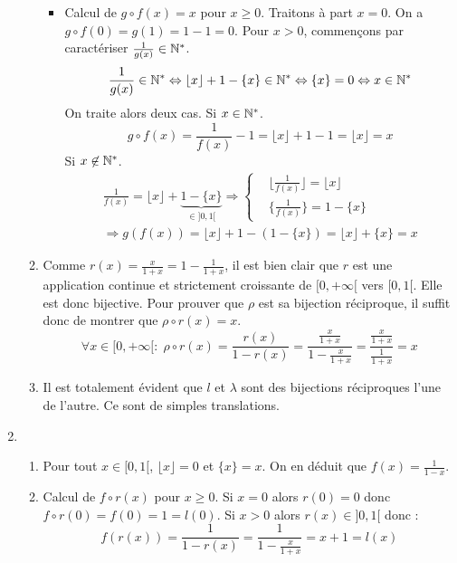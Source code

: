 \begin{enumerate}
\begin{enumerate}
\begin{itemize}
 \item Calcul de $g \circ f(x)=x$ pour $x\geq 0$.\newline
Traitons à part $x=0$. On a $g\circ f(0)=g(1)=1-1=0$.\newline
Pour $x>0$, commençons par caractériser $\frac{1}{g(x)}\in \mathbb{N}^*$.
\begin{displaymath}
 \frac{1}{g(x)}\in \mathbb{N}^* \Leftrightarrow \lfloor x\rfloor +1-\{x\}\in \mathbb{N}^*
\Leftrightarrow \{x\}=0 \Leftrightarrow x\in \mathbb{N}^*
\end{displaymath}
On traite alors deux cas.\newline
Si $x\in \mathbb{N}^*$.
\begin{displaymath}
 g\circ f(x) = \frac{1}{f(x)}-1=\lfloor x\rfloor +1-1=\lfloor x\rfloor=x
\end{displaymath}
Si $x\not\in \mathbb{N}^*$.
\begin{multline*}
 \frac{1}{f(x)}=\lfloor x\rfloor + \underset{\in ]0,1[}{\underbrace{1-\{x\}}}
\Rightarrow
\left\lbrace
\begin{aligned}
 &\lfloor\frac{1}{f(x)}\rfloor=\lfloor x\rfloor\\
 &\{\frac{1}{f(x)}\}=1-\{x\}
\end{aligned}
\right. \\
\Rightarrow
g(f(x))=\lfloor x\rfloor +1 -(1-\{x\})=\lfloor x\rfloor +\{x\}=x
\end{multline*}

\end{itemize}

 \item Comme $r(x)=\frac{x}{1+x}=1-\frac{1}{1+x}$, il est bien clair que $r$ est une application continue et strictement croissante de $[0,+\infty[$ vers $[0,1[$. Elle est donc bijective. Pour prouver que $\rho$ est sa bijection réciproque, il suffit donc de montrer que $\rho\circ r(x)=x$.
\begin{displaymath}
 \forall x\in [0,+\infty[:\;
\rho\circ r(x)=\frac{r(x)}{1-r(x)}=\frac{\frac{x}{1+x}}{1-\frac{x}{1+x}}=\frac{\frac{x}{1+x}}{\frac{1}{1+x}}=x
\end{displaymath}
  
 \item Il est totalement évident que $l$ et $\lambda$ sont des bijections réciproques l'une de l'autre. Ce sont de simples translations.
\end{enumerate}
 
 \item
\begin{enumerate}
 \item Pour tout $x\in[0,1[$, $\lfloor x\rfloor =0$ et $\{x\}=x$. On en déduit que $f(x)=\frac{1}{1-x}$.
 \item Calcul de $f\circ r(x)$ pour $x\geq 0$.\newline
Si $x=0$ alors $r(0)=0$ donc $f\circ r (0)=f(0)=1=l(0)$.\newline
Si $x> 0$ alors $r(x)\in]0,1[$ donc :
\begin{displaymath}
 f(r(x))=\frac{1}{1-r(x)}=\frac{1}{1-\frac{x}{1+x}}=x+1=l(x)
\end{displaymath}


\end{enumerate}
\end{enumerate}
